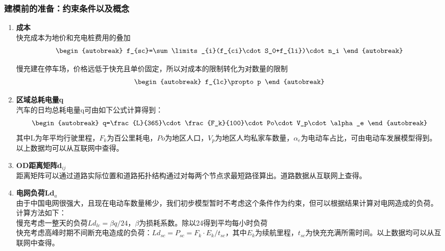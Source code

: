 \documentclass[12pt, a4paper, oneside]{ctexart}
\begin{document}
\subsubsection{建模前的准备：约束条件以及概念}
\begin{enumerate}[label = \alph*)]
    \item \textbf{成本}\\
          快充成本为地价和充电桩费用的叠加
          \begin{align}\begin{autobreak}
                  f_{sc}=\sum\limits_{i}(f_{ci}\cdot S_0+f_{li})\cdot n_i
              \end{autobreak}\end{align}



          慢充建在停车场，价格远低于快充且单价固定，所以对成本的限制转化为对数量的限制
          \begin{align}\begin{autobreak}
                  f_{lc}\propto p
              \end{autobreak}\end{align}
    \item \textbf{区域总耗电量q}\\
          汽车的日均总耗电量q可由如下公式计算得到：
          \begin{align}\begin{autobreak}
                  q=\frac{L}{365}\cdot \frac{F_k}{100}\cdot Po\cdot V_p\cdot \alpha_e
              \end{autobreak}\end{align}
          其中L为年平均行驶里程，\(F_k\)为百公里耗电，\(Po\)为地区人口，\(V_p\)为地区人均私家车数量，\(\alpha_e\)为电动车占比，可由电动车发展模型得到。以上数据均可以从互联网中查得。
    \item \textbf{OD距离矩阵d\(_{ij}\)}\\
          距离矩阵可以通过道路实际位置和道路拓扑结构通过对每两个节点求最短路径算出。道路数据从互联网上查得。
    \item \textbf{电网负荷Ld\(_a\)}\\
          由于中国电网很强大，且现在电动车数量稀少，我们初步模型暂时不考虑这个条件作为约束，但可以根据结果计算对电网造成的负荷。计算方法如下：\\
          慢充考虑一整天的负荷\(Ld_{lc}=\beta q/24\)，\(\beta\)为损耗系数。除以24得到平均每小时负荷\\
          快充考虑高峰时期不间断充电造成的负荷：\(Ld_{sc}=P_{sc}=F_k\cdot E_k/t_{sc}\)，其中\(E_k\)为续航里程，\(t_{sc}\)为快充充满所需时间。以上数据均可以从互联网中查得。


\end{enumerate}
\end{document}
